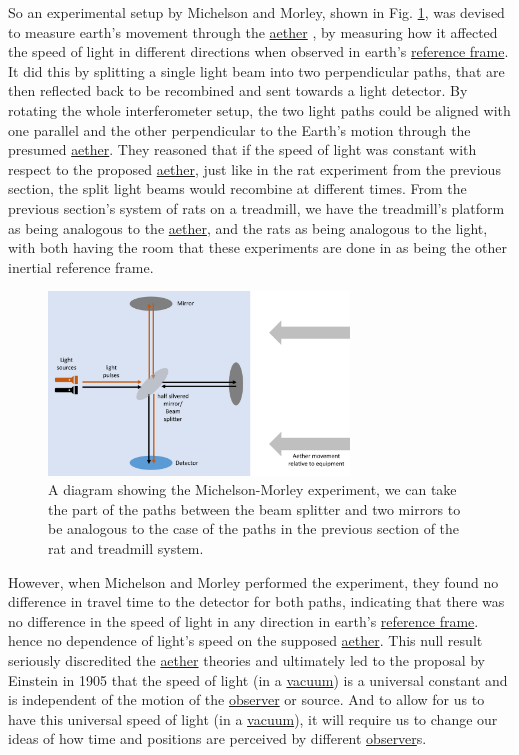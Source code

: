 So an experimental setup by Michelson and Morley, shown in Fig. \ref{fig: Michelson_morley}, was devised to measure earth's movement through the \hyperlink{def-aether}{aether} \cite{EtherExperiment}, by measuring how it affected the speed of light in different directions when observed in earth's \hyperlink{def-Reference-frame}{reference frame}. It did this by splitting a single light beam into two perpendicular paths, that are then reflected back to be recombined and sent towards a light detector. By rotating the whole interferometer setup, the two light paths could be aligned with one parallel and the other perpendicular to the Earth’s motion through the presumed \hyperlink{def-aether}{aether}.
They reasoned that if the speed of light was constant with respect to the proposed \hyperlink{def-aether}{aether}, just like in the rat experiment from the previous section, the split light beams would recombine at different times. From the previous section's system of rats on a treadmill, we have the treadmill's platform as being analogous to the \hyperlink{def-aether}{aether}, and the rats as being analogous to the light, with both having the room that these experiments are done in as being the other inertial reference frame.

\begin{figure}[H]
	\centering
	\includegraphics[width=8cm]{images/pdf/Michelson_morley.pdf}
	\caption{A diagram showing the Michelson-Morley experiment, we can take the part of the paths between the beam splitter and two mirrors to be analogous to the case of the paths in the previous section of the rat and treadmill system.}
	\label{fig: Michelson_morley}
\end{figure}

However, when Michelson and Morley performed the experiment, they found no difference in travel time to the detector for both paths, indicating that there was no difference in the speed of light in any direction in earth's \hyperlink{def-Reference-frame}{reference frame}. hence no dependence of light's speed on the supposed \hyperlink{def-aether}{aether}. This null result seriously discredited the \hyperlink{def-aether}{aether} theories and ultimately led to the proposal by Einstein in 1905 that the speed of light (in a \hyperlink{def-vacuum}{vacuum}) is a universal constant and is independent of the motion of the \hyperlink{def-observer}{observer} or source. And to allow for us to have this universal speed of light (in a \hyperlink{def-vacuum}{vacuum}), it will require us to change our ideas of how time and positions are perceived by different \hyperlink{def-observer}{observer}s.


